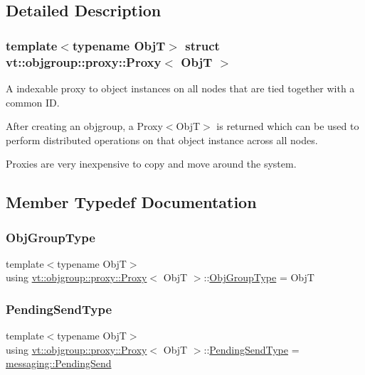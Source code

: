 \subsection{Detailed Description}
\subsubsection*{template$<$typename ObjT$>$\newline
struct vt\+::objgroup\+::proxy\+::\+Proxy$<$ Obj\+T $>$}

A indexable proxy to object instances on all nodes that are tied together with a common ID. 

After creating an objgroup, a Proxy$<$\+Obj\+T$>$ is returned which can be used to perform distributed operations on that object instance across all nodes.

Proxies are very inexpensive to copy and move around the system. 

\subsection{Member Typedef Documentation}
\mbox{\label{structvt_1_1objgroup_1_1proxy_1_1_proxy_a6f11b9652eee64f87bdff5a83fe1f7bb}} 
\subsubsection{\texorpdfstring{Obj\+Group\+Type}{ObjGroupType}}
{\footnotesize\ttfamily template$<$typename ObjT$>$ \\
using \hyperlink{structvt_1_1objgroup_1_1proxy_1_1_proxy}{vt\+::objgroup\+::proxy\+::\+Proxy}$<$ ObjT $>$\+::\hyperlink{structvt_1_1objgroup_1_1proxy_1_1_proxy_a6f11b9652eee64f87bdff5a83fe1f7bb}{Obj\+Group\+Type} =  ObjT}

\mbox{\label{structvt_1_1objgroup_1_1proxy_1_1_proxy_a1bdf8713203531d306702a024872bb08}} 
\subsubsection{\texorpdfstring{Pending\+Send\+Type}{PendingSendType}}
{\footnotesize\ttfamily template$<$typename ObjT$>$ \\
using \hyperlink{structvt_1_1objgroup_1_1proxy_1_1_proxy}{vt\+::objgroup\+::proxy\+::\+Proxy}$<$ ObjT $>$\+::\hyperlink{structvt_1_1objgroup_1_1proxy_1_1_proxy_a1bdf8713203531d306702a024872bb08}{Pending\+Send\+Type} =  \hyperlink{structvt_1_1messaging_1_1_pending_send}{messaging\+::\+Pending\+Send}}

